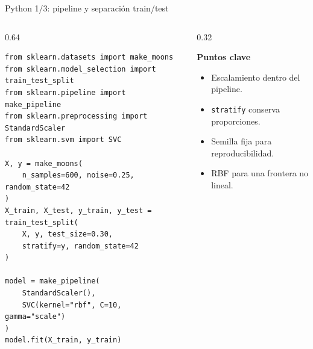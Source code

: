 \begin{frame}[fragile]{Python 1/3: pipeline y separación train/test}
\scriptsize
\begin{columns}[T,onlytextwidth]
\begin{column}{0.64\textwidth}
\begin{lstlisting}[style=ccdepython]
from sklearn.datasets import make_moons
from sklearn.model_selection import train_test_split
from sklearn.pipeline import make_pipeline
from sklearn.preprocessing import StandardScaler
from sklearn.svm import SVC

X, y = make_moons(
    n_samples=600, noise=0.25, random_state=42
)
X_train, X_test, y_train, y_test = train_test_split(
    X, y, test_size=0.30,
    stratify=y, random_state=42
)

model = make_pipeline(
    StandardScaler(),
    SVC(kernel="rbf", C=10, gamma="scale")
)
model.fit(X_train, y_train)
\end{lstlisting}
\end{column}
\begin{column}{0.32\textwidth}
\begin{keybox}
\textbf{Puntos clave}
\begin{itemize}
  \item Escalamiento dentro del pipeline.
  \item \texttt{stratify} conserva proporciones.
  \item Semilla fija para reproducibilidad.
  \item RBF para una frontera no lineal.
\end{itemize}
\end{keybox}
\end{column}
\end{columns}
\end{frame}

